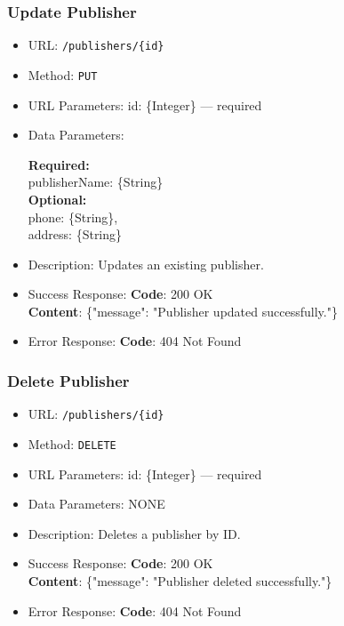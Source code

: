 \subsubsection*{Update Publisher}

\begin{itemize}
    \item URL: \texttt{/publishers/\{id\}}
    \item Method: \texttt{PUT}
    \item URL Parameters: id: \{Integer\} — required
    \item Data Parameters:

    \textbf{Required:} \\
    publisherName: \{String\} \\
    
    \textbf{Optional:} \\
    phone: \{String\}, \\
    address: \{String\}

    \item Description: Updates an existing publisher.

    \item Success Response: \newline
    \textbf{Code}: 200 OK \\
    \textbf{Content}: \{"message": "Publisher updated successfully."\}

    \item Error Response: \newline
    \textbf{Code}: 404 Not Found
\end{itemize}

\subsubsection*{Delete Publisher}

\begin{itemize}
    \item URL: \texttt{/publishers/\{id\}}
    \item Method: \texttt{DELETE}
    \item URL Parameters: id: \{Integer\} — required
    \item Data Parameters: NONE
    \item Description: Deletes a publisher by ID.

    \item Success Response: \newline
    \textbf{Code}: 200 OK \\
    \textbf{Content}: \{"message": "Publisher deleted successfully."\}

    \item Error Response: \newline
    \textbf{Code}: 404 Not Found
\end{itemize}

